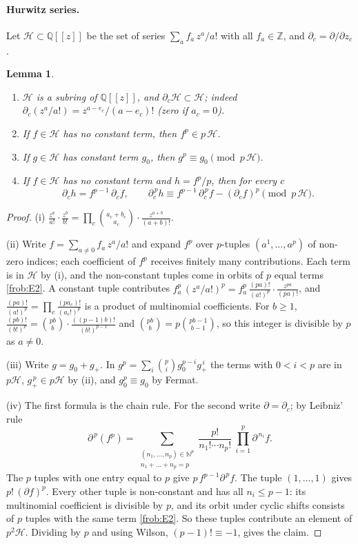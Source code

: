 \documentclass[11pt]{article}
\newtheorem{lemma}[theorem]{Lemma}
\theoremstyle{definition}
\theoremstyle{remark}
\numberwithin{equation}{section}
\numberwithin{figure}{section}
\newcommand{\Z}{\mathbb Z}
\newcommand{\Q}{\mathbb Q}
\newcommand{\N}{\mathbb N}
\newcommand{\Hur}{\mathcal H}
\begin{document}
\paragraph{Hurwitz series.} Let $\Hur\subset\Q[[z]]$ be the set of series
$\sum_af_a\,z^a/a!$ with all $f_a\in\Z$, and $\partial_c=\partial/\partial z_c$.

\begin{lemma}\label{frob:lem:hur}
\begin{enumerate}[label=(\roman*)]
\item $\Hur$ is a subring of $\Q[[z]]$, and $\partial_c\Hur\subset\Hur$; indeed
      $\partial_c(z^a/a!)=z^{a-e_c}/(a-e_c)!$ (zero if $a_c=0$).
\item If $f\in\Hur$ has no constant term, then $f^p\in p\,\Hur$.
\item If $g\in\Hur$ has constant term $g_0$, then $g^p\equiv g_0\pmod{p\,\Hur}$.
\item If $f\in\Hur$ has no constant term and $h=f^p/p$, then for every $c$
\[
 \partial_ch=f^{p-1}\,\partial_cf,\qquad
 \partial_c^{\,p}h\equiv f^{p-1}\,\partial_c^{\,p}f-(\partial_cf)^p\pmod{p\,\Hur}.
\]
\end{enumerate}
\end{lemma}

\begin{proof}
(i) $\frac{z^a}{a!}\cdot\frac{z^b}{b!}=\prod_c\binom{a_c+b_c}{a_c}\cdot\frac{z^{a+b}}{(a+b)!}$.

(ii) Write $f=\sum_{a\ne0}f_a\,z^a/a!$ and expand $f^p$ over $p$-tuples $(a^1,\dots,a^p)$ of
non-zero indices; each coefficient of $f^p$ receives finitely many contributions. Each term is
in $\Hur$ by (i), and the non-constant tuples come in orbits of $p$ equal terms \ref{frob:E2}. A
constant tuple contributes $f_a^p\,(z^a/a!)^p=f_a^p\,\frac{(pa)!}{(a!)^p}\cdot\frac{z^{pa}}{(pa)!}$,
and $\frac{(pa)!}{(a!)^p}=\prod_c\frac{(pa_c)!}{(a_c!)^p}$ is a product of multinomial
coefficients. For $b\ge1$,
$\frac{(pb)!}{(b!)^p}=\binom{pb}{b}\cdot\frac{((p-1)b)!}{(b!)^{p-1}}$ and
$\binom{pb}{b}=p\binom{pb-1}{b-1}$, so this integer is divisible by $p$ as $a\ne0$.

(iii) Write $g=g_0+g_+$. In $g^p=\sum_i\binom pig_0^{p-i}g_+^{\,i}$ the terms with $0<i<p$
are in $p\Hur$, $g_+^{\,p}\in p\Hur$ by (ii), and $g_0^p\equiv g_0$ by Fermat.

(iv) The first formula is the chain rule. For the second write $\partial=\partial_c$; by
Leibniz' rule
\[
 \partial^{\,p}(f^p)=\sum_{\substack{(n_1,\dots,n_p)\in\N^p\\ n_1+\dots+n_p=p}}
 \frac{p!}{n_1!\cdots n_p!}\ \prod_{i=1}^p\partial^{\,n_i}f .
\]
The $p$ tuples with one entry equal to $p$ give $p\,f^{p-1}\partial^{\,p}f$. The tuple
$(1,\dots,1)$ gives $p!\,(\partial f)^p$. Every other tuple is non-constant and has all
$n_i\le p-1$: its multinomial coefficient is divisible by $p$, and its orbit under cyclic
shifts consists of $p$ tuples with the same term \ref{frob:E2}. So these tuples contribute an
element of $p^2\Hur$. Dividing by $p$ and using Wilson, $(p-1)!\equiv-1$, gives the claim.
\end{proof}
\end{document}
